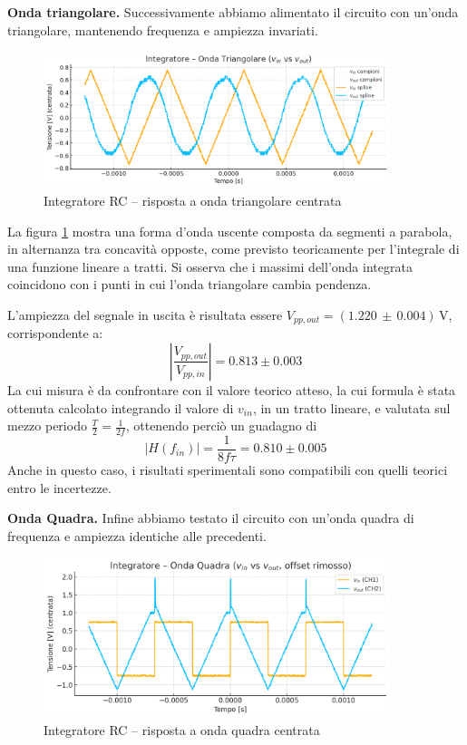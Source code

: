 \documentclass[a4paper,12pt]{article}
\begin{document}
\vspace{0.3cm}
\textbf{Onda triangolare.}
Successivamente abbiamo alimentato il circuito con un’onda triangolare, mantenendo frequenza e ampiezza invariati.

\begin{figure}[H]
  \centering
  \includegraphics[width=0.9\textwidth]{Triangolare2.png}
  \caption{Integratore RC – risposta a onda triangolare centrata}
  \label{fig:integratore_triang}
\end{figure}

La figura \ref{fig:integratore_triang} mostra una forma d’onda uscente composta da segmenti a parabola, in alternanza tra concavità opposte, come previsto teoricamente per l’integrale di una funzione lineare a tratti. Si osserva che i massimi dell’onda integrata coincidono con i punti in cui l’onda triangolare cambia pendenza. 

L’ampiezza del segnale in uscita è risultata essere \(V_{pp,out} = (1.220\,\pm\,0.004)\,\mathrm{V}\), corrispondente a:
\[
\left| \frac{V_{pp, out}}{V_{pp, in}} \right| = 0.813 \pm 0.003
\]
La cui misura è da confrontare con il valore teorico atteso, la cui formula è stata ottenuta calcolato
integrando il valore di \(v_{in}\), in un tratto lineare, e valutata sul mezzo periodo \(\frac{T}{2}=\frac{1}{2f}\), ottenendo perciò un guadagno di 
\[
\left| H(f_{in}) \right| = \frac{1}{8 f \tau} = 0.810 \pm 0.005
\]
Anche in questo caso, i risultati sperimentali sono compatibili con quelli teorici entro le incertezze.

\vspace{0.3cm}
\textbf{Onda Quadra.}
Infine abbiamo testato il circuito con un’onda quadra di frequenza e ampiezza identiche alle precedenti.

\begin{figure}[H]
  \centering
  \includegraphics[width=0.9\textwidth]{Quadrata2.png}
  \caption{Integratore RC – risposta a onda quadra centrata}
  \label{fig:integratore_quadra}
\end{figure}
\end{document}
